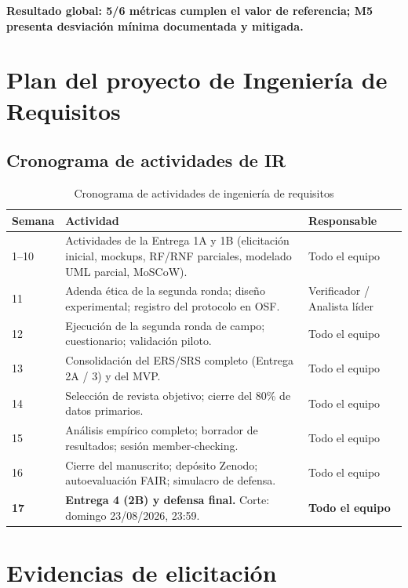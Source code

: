 \documentclass[11pt,a4paper]{article}
\begin{document}
\textbf{Resultado global: 5/6 métricas cumplen el valor de referencia; M5 presenta desviación mínima documentada y mitigada.}

\appendix

\section{Plan del proyecto de Ingeniería de Requisitos}

\subsection{Cronograma de actividades de IR}

\begin{longtable}{|p{1.6cm}|p{8.5cm}|p{3.5cm}|}
\caption{Cronograma de actividades de ingeniería de requisitos}\\
\hline
\textbf{Semana} & \textbf{Actividad} & \textbf{Responsable} \\
\hline
1--10 & Actividades de la Entrega 1A y 1B (elicitación inicial, mockups, RF/RNF parciales, modelado UML parcial, MoSCoW). & Todo el equipo \\
\hline
11 & Adenda ética de la segunda ronda; diseño experimental; registro del protocolo en OSF. & Verificador / Analista líder \\
\hline
12 & Ejecución de la segunda ronda de campo; cuestionario; validación piloto. & Todo el equipo \\
\hline
13 & Consolidación del ERS/SRS completo (Entrega 2A / 3) y del MVP. & Todo el equipo \\
\hline
14 & Selección de revista objetivo; cierre del 80\% de datos primarios. & Todo el equipo \\
\hline
15 & Análisis empírico completo; borrador de resultados; sesión member-checking. & Todo el equipo \\
\hline
16 & Cierre del manuscrito; depósito Zenodo; autoevaluación FAIR; simulacro de defensa. & Todo el equipo \\
\hline
\textbf{17} & \textbf{Entrega 4 (2B) y defensa final.} Corte: domingo 23/08/2026, 23:59. & \textbf{Todo el equipo} \\
\hline
\end{longtable}

\section{Evidencias de elicitación}
\end{document}
